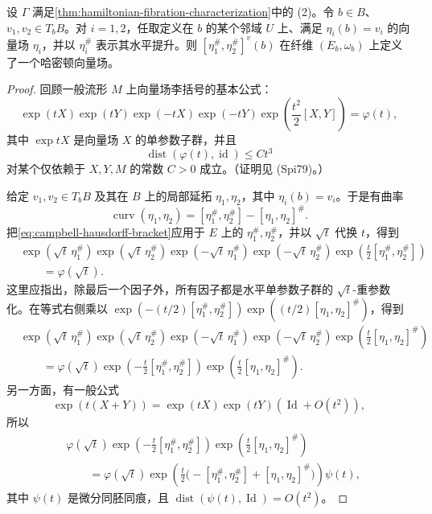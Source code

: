 \begin{proposition}\label{prop:curvature-vector-hamiltonian}
设 $\Gamma$ 满足\cref{thm:hamiltonian-fibration-characterization}中的 (2)。令
$b\in B$、$v_1,v_2\in T_bB$。对 $i=1,2$，任取定义在 $b$ 的某个邻域
$U$ 上、满足 $\eta_i(b)=v_i$ 的向量场 $\eta_i$，并以 $\eta_i^\#$ 表示其水平提升。则
$[\eta_1^\#,\eta_2^\#]^v(b)$ 在纤维 $(E_b,\omega_b)$ 上定义了一个哈密顿向量场。
\end{proposition}

\begin{proof}
回顾一般流形 $M$ 上向量场李括号的基本公式：
\begin{equation}
 \exp(tX)\exp(tY)\exp(-tX)\exp(-tY)
 \exp\left(\frac{t^2}{2}[X,Y]\right)=\varphi(t),
 \label{eq:campbell-hausdorff-bracket}
\end{equation}
其中 $\exp tX$ 是向量场 $X$ 的单参数子群，并且
\begin{equation}
 \operatorname{dist}(\varphi(t),\operatorname{id})\leq Ct^3
 \label{eq:campbell-hausdorff-error}
\end{equation}
对某个仅依赖于 $X,Y,M$ 的常数 $C>0$ 成立。（证明见 (Spi79)。）

给定 $v_1,v_2\in T_bB$ 及其在 $B$ 上的局部延拓 $\eta_1,\eta_2$，其中
$\eta_i(b)=v_i$。于是有曲率
\[
 \operatorname{curv}(\eta_1,\eta_2)
 =[\eta_1^\#,\eta_2^\#]-[\eta_1,\eta_2]^\#.
\]
把\eqref{eq:campbell-hausdorff-bracket}应用于 $E$ 上的
$\eta_1^\#,\eta_2^\#$，并以 $\sqrt t$ 代换 $t$，得到
\[
\begin{aligned}
 &\exp(\sqrt t\,\eta_1^\#)
  \exp(\sqrt t\,\eta_2^\#)
  \exp(-\sqrt t\,\eta_1^\#)
  \exp(-\sqrt t\,\eta_2^\#)
  \exp\left(\frac t2[\eta_1^\#,\eta_2^\#]\right)\\
 &\qquad=\varphi(\sqrt t).
\end{aligned}
\]
这里应指出，除最后一个因子外，所有因子都是水平单参数子群的
$\sqrt t$-重参数化。在等式右侧乘以
$\exp(-(t/2)[\eta_1^\#,\eta_2^\#])
 \exp((t/2)[\eta_1,\eta_2]^\#)$，得到
\[
\begin{aligned}
 &\exp(\sqrt t\,\eta_1^\#)
  \exp(\sqrt t\,\eta_2^\#)
  \exp(-\sqrt t\,\eta_1^\#)
  \exp(-\sqrt t\,\eta_2^\#)
  \exp\left(\frac t2[\eta_1,\eta_2]^\#\right)\\
 &\qquad=\varphi(\sqrt t)
  \exp\left(-\frac t2[\eta_1^\#,\eta_2^\#]\right)
  \exp\left(\frac t2[\eta_1,\eta_2]^\#\right).
\end{aligned}
\]
另一方面，有一般公式
\[
 \exp(t(X+Y))=\exp(tX)\exp(tY)(\operatorname{Id}+O(t^2)),
\]
所以
\[
\begin{aligned}
 &\varphi(\sqrt t)
  \exp\left(-\frac t2[\eta_1^\#,\eta_2^\#]\right)
  \exp\left(\frac t2[\eta_1,\eta_2]^\#\right)\\
 &\qquad=\varphi(\sqrt t)
  \exp\left(\frac t2
   \bigl(-[\eta_1^\#,\eta_2^\#]+[\eta_1,\eta_2]^\#\bigr)\right)
  \psi(t),
\end{aligned}
\]
其中 $\psi(t)$ 是微分同胚同痕，且
$\operatorname{dist}(\psi(t),\operatorname{Id})=O(t^2)$。


\end{proof}
